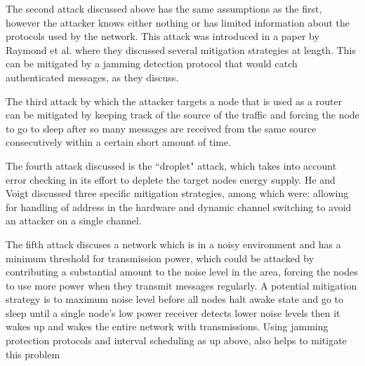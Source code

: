 The second attack discussed above has the same assumptions as the first, however the attacker knows either nothing or has limited information about the protocols used by the network. This attack was introduced in a paper by
Raymond et al. where they discussed several mitigation strategies at length\cite{4476299}. This can be mitigated by a jamming detection protocol that would catch authenticated messages, as they discuss. 

The third attack by which the attacker targets a node that is used as a router can be mitigated by keeping track of the source of the traffic and forcing the node to go to sleep after so many messages are received from the same
source consecutively within a certain short amount of time. 

The fourth attack discussed is the ``droplet" attack, which takes into account error checking in its effort to deplete the target nodes energy supply. He and Voigt discussed three specific mitigation strategies, among which were:
 allowing for handling of address in the hardware and dynamic channel switching to avoid an attacker on a single channel.

The fifth attack discuses a network which is in a noisy environment and has a minimum threshold for transmission power, which could be attacked by contributing a substantial amount to the noise level in the area, forcing the nodes
to use more power when they transmit messages regularly. A potential mitigation strategy is to maximum noise level before all nodes halt awake state and go to sleep until a single node's low power receiver detects lower noise levels
then it wakes up and wakes the entire network with transmissions. Using jamming protection protocols and interval scheduling as up above, also helps to mitigate this problem\cite{4476299}
 
   
